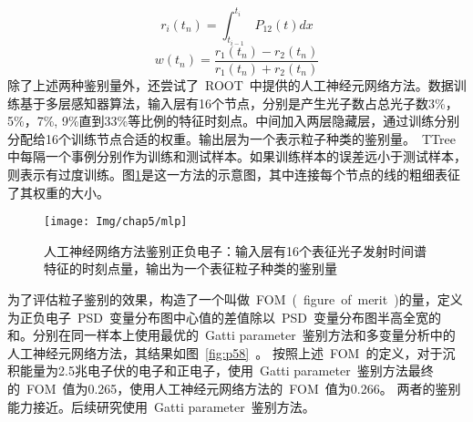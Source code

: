  \begin{equation*}
 r_{i}(t_{n})=\int_{t_{i-1}}^{t_{i}}P_{12}(t)dx
 \end{equation*}
 \begin{equation*}
 w(t_{n})=\frac{r_{1}(t_{n})-r_{2}(t_{n})}{r_{1}(t_{n})+r_{2}(t_{n})}
 \end{equation*}
除了上述两种鉴别量外，还尝试了~ROOT~中提供的人工神经元网络方法。数据训练基于多层感知器算法，输入层有16个节点，分别是产生光子数占总光子数3\%，5\%，7\%, 9\%直到33\%等比例的特征时刻点。中间加入两层隐藏层，通过训练分别分配给16个训练节点合适的权重。输出层为一个表示粒子种类的鉴别量。~TTree~ 中每隔一个事例分别作为训练和测试样本。如果训练样本的误差远小于测试样本，则表示有过度训练。图\ref{fig:p57}是这一方法的示意图，其中连接每个节点的线的粗细表征了其权重的大小。
\begin{figure}[!htbp]
  \centering
   \texttt{[image: Img/chap5/mlp]}
    \caption{人工神经网络方法鉴别正负电子：输入层有16个表征光子发射时间谱特征的时刻点量，输出为一个表征粒子种类的鉴别量}
  \label{fig:p57}
\end{figure}
为了评估粒子鉴别的效果，构造了一个叫做~FOM~(~figure~of~merit~)的量，定义为正负电子~PSD~变量分布图中心值的差值除以~PSD~变量分布图半高全宽的和。分别在同一样本上使用最优的~Gatti parameter~鉴别方法和多变量分析中的人工神经元网络方法，其结果如图~\ref{fig:p58}~。 按照上述~FOM~的定义，对于沉积能量为2.5兆电子伏的电子和正电子，使用~Gatti parameter~鉴别方法最终的~FOM~值为0.265，使用人工神经元网络方法的~FOM~值为0.266。 两者的鉴别能力接近。后续研究使用~Gatti parameter~鉴别方法。

